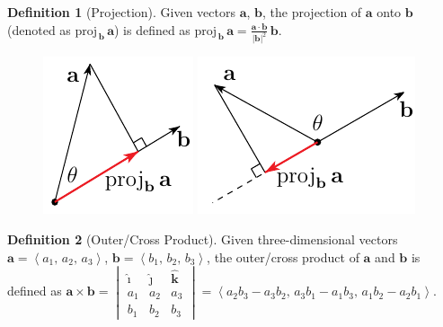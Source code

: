 \documentclass[12pt]{extarticle}
\newcommand{\ds}{\displaystyle}
\newcommand{\llt}{\left\langle}
\newcommand{\rgt}{\right\rangle}
\newcommand{\proj}[2]{\mathrm{proj}_{\,#2}\,#1}
\theoremstyle{definition}
\newtheorem*{dfn}{Definition}
\newcommand{\va}{\mathbf{a}}
\newcommand{\vb}{\mathbf{b}}
\newcommand{\hi}{\widehat{\pmb{\imath}}}
\newcommand{\hj}{\widehat{\pmb{\jmath}}}
\newcommand{\hk}{\widehat{\mathbf{k}}}
\begin{document}
\begin{dfn}[Projection] 
  Given vectors $\va$, $\vb$, the projection of $\va$ onto $\vb$ (denoted as $\ds\proj{\va}{\vb}$) is defined as $\ds\proj{\va}{\vb} = \frac{\va\cdot\vb}{|\vb|^2}\,\vb$. 
\end{dfn}

\begin{figure}[!htbp]
  \centering
  \includegraphics[scale=1,page=1]{fig/projA.pdf}
  \qquad\qquad
  \includegraphics[scale=1,page=1]{fig/projB.pdf}
\end{figure}

\vspace{-5mm}
\begin{dfn}[Outer/Cross Product] 
  Given three-dimensional vectors $\va = \llt a_1,\,a_2,\,a_3\rgt$, $\vb = \llt b_1,\,b_2,\,b_3\rgt$, the outer/cross product of $\va$ and $\vb$ is defined as $\ds\va\times\vb = \begin{vmatrix}\hi & \hj & \hk \\ a_1 & a_2 & a_3 \\ b_1 & b_2 & b_3\end{vmatrix} = \llt a_2b_3 - a_3b_2,\,a_3b_1 - a_1b_3,\,a_1b_2 - a_2b_1\rgt$. 
\end{dfn}
\end{document}
